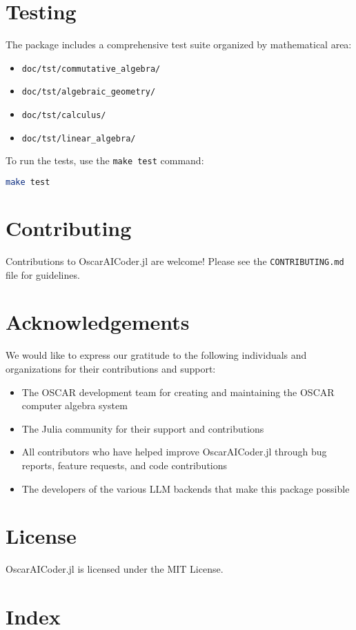 \documentclass[11pt,a4paper]{article}
\begin{document}
\section{Testing}
\label{sec:testing}

The package includes a comprehensive test suite organized by mathematical area:

\begin{itemize}
    \item \texttt{doc/tst/commutative\_algebra/}
    \item \texttt{doc/tst/algebraic\_geometry/}
    \item \texttt{doc/tst/calculus/}
    \item \texttt{doc/tst/linear\_algebra/}
\end{itemize}

To run the tests, use the \texttt{make test} command:

\begin{lstlisting}[language=bash]
make test
\end{lstlisting}

\section{Contributing}
\label{sec:contributing}

Contributions to OscarAICoder.jl are welcome! Please see the \texttt{CONTRIBUTING.md} file for guidelines.

\section*{Acknowledgements}
\label{sec:acknowledgements}

We would like to express our gratitude to the following individuals and organizations for their contributions and support:

\begin{itemize}
    \item The OSCAR development team for creating and maintaining the OSCAR computer algebra system
    \item The Julia community for their support and contributions
    \item All contributors who have helped improve OscarAICoder.jl through bug reports, feature requests, and code contributions
    \item The developers of the various LLM backends that make this package possible
\end{itemize}

\section{License}
\label{sec:license}

OscarAICoder.jl is licensed under the MIT License.

\clearpage
\section*{Index}
\printindex
\end{document}
